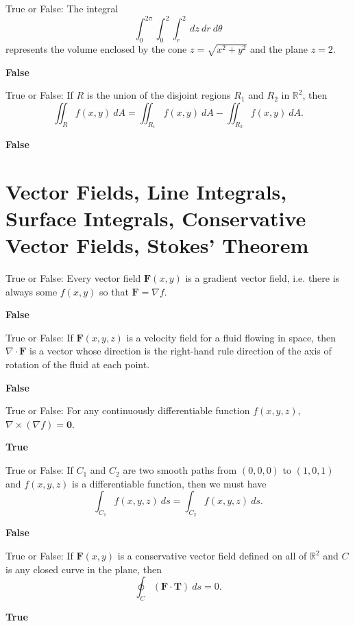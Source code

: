 \documentclass{exam}
\newcommand{\R}{\mathbb{R}}
\newcommand{\bT}{\mathbf{T}}
\newcommand{\bF}{\mathbf{F}}
\begin{document}
\begin{questions}
		\question True or False: The integral \[ \int_0^{2\pi}\int_0^2\int_r^2\ dz\ dr\ d\theta \] represents the volume enclosed by the cone $z=\sqrt{x^2+y^2}$ and the plane $z=2$.
		\begin{solution}
			\textbf{False}
		\end{solution}
		
		\question True or False: If $R$ is the union of the disjoint regions $R_1$ and $R_2$ in $\R^2$, then \[\iint_R f(x,y)\ dA = \iint_{R_1} f(x,y)\ dA - \iint_{R_2} f(x,y)\ dA. \]
		\begin{solution}
			\textbf{False}
		\end{solution}
		
		\section{Vector Fields, Line Integrals, Surface Integrals, Conservative Vector Fields, Stokes' Theorem}
		
		\question True or False:  Every vector field $\bF(x,y)$ is a gradient vector field, i.e. there is always some $f(x,y)$ so that $\bF=\nabla f$.
		 \begin{solution}
		 	\textbf{False}
		 \end{solution}

		\question True or False:  If $\bF(x,y,z)$ is a velocity field for a fluid flowing in space, then $\nabla \cdot \bF$ is a vector whose direction is the right-hand rule direction of the axis of rotation of the fluid at each point.
		 \begin{solution}
		 	\textbf{False}
		 \end{solution}

		\question True or False:  For any continuously differentiable function $f(x,y,z)$, $\nabla\times(\nabla f) = \mathbf{0}$.
		\begin{solution}
			\textbf{True}
		\end{solution}
		
		\question True or False: If $C_1$ and $C_2$ are two smooth paths from $(0,0,0)$ to $(1,0,1)$ and $f(x,y,z)$ is a differentiable function, then we must have
		\[ \int_{C_1} f(x,y,z)\ ds = \int_{C_2} f(x,y,z)\ ds. \]
		\begin{solution}
			\textbf{False}
		\end{solution}
		
		\question True or False: If $\bF(x,y)$ is a conservative vector field defined on all of $\mathbb{R}^2$ and $C$ is any closed curve in the plane, then \[\oint_C (\bF\cdot \bT)\ ds = 0.\]
		\begin{solution}
			\textbf{True}
		\end{solution}


\end{questions}
\end{document}
